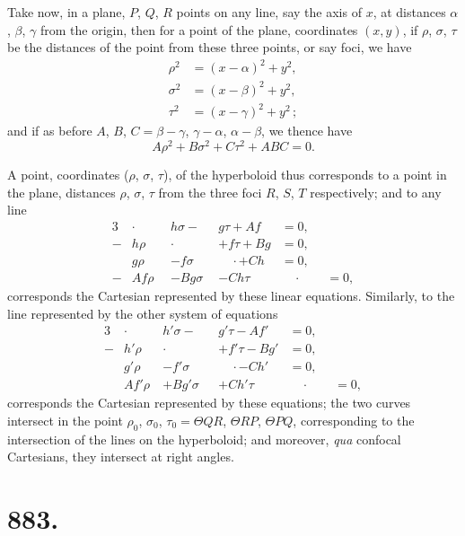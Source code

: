 \documentclass[11pt,a4paper]{article}
\theoremstyle{plain}
\theoremstyle{definition}
\begin{document}
Take now, in a plane, $P$, $Q$, $R$ points on any line, say the axis of $x$, at distances $\alpha$, $\beta$, $\gamma$ from the origin, then for a point of the plane, coordinates $(x, y)$, if $\rho$, $\sigma$, $\tau$ be the distances of the point from these three points, or say foci, we have
\begin{align*}
\rho^2 &= (x-\alpha)^2 + y^2, \\
\sigma^2 &= (x-\beta)^2 + y^2, \\
\tau^2 &= (x-\gamma)^2 + y^2\,;
\end{align*}
and if as before $A$, $B$, $C = \beta-\gamma$, $\gamma-\alpha$, $\alpha-\beta$, we thence have
\[ A\rho^2 + B\sigma^2 + C\tau^2 + ABC = 0. \]

A point, coordinates ($\rho$, $\sigma$, $\tau$), of the hyperboloid thus corresponds to a point in the plane, distances $\rho$, $\sigma$, $\tau$ from the three foci $R$, $S$, $T$ respectively; and to any line
\begin{alignat*}{3}
&\cdot\qquad & h\sigma -\phantom{g}\, &g\tau + Af &= 0, \\
-&h\rho &\cdot\qquad & + f\tau + Bg &= 0, \\
&g\rho & - f\sigma &\quad\cdot + Ch &= 0, \\
-&Af\rho & - Bg\sigma & - Ch\tau &\quad\cdot\qquad = 0,
\end{alignat*}
corresponds the Cartesian represented by these linear equations. Similarly, to the line represented by the other system of equations
\begin{alignat*}{3}
&\cdot\qquad & h'\sigma -\phantom{g'}\, &g'\tau - Af' &= 0, \\
-&h'\rho &\cdot\qquad & + f'\tau - Bg' &= 0, \\
&g'\rho & - f'\sigma &\quad\cdot - Ch' &= 0, \\
&Af'\rho & + Bg'\sigma & + Ch'\tau &\quad\cdot\qquad = 0,
\end{alignat*}
corresponds the Cartesian represented by these equations; the two curves intersect in the point $\rho_0$, $\sigma_0$, $\tau_0 = \Theta QR$, $\Theta RP$, $\Theta PQ$, corresponding to the intersection of the lines on the hyperboloid; and moreover, \textit{qua} confocal Cartesians, they intersect at right angles.


\newpage
\section*{883.}
\end{document}
